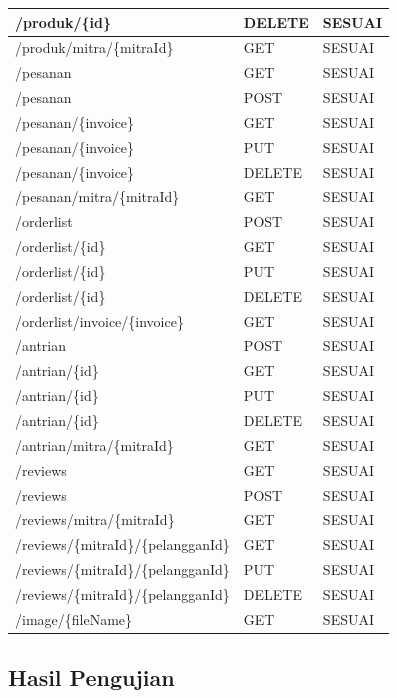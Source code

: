 \begin{longtable}{| p{10cm} | p{1.5cm} | p{1.5cm} |}
  \hline
  /produk/\{id\} & DELETE  & SESUAI \\
  \hline
  /produk/mitra/\{mitraId\} & GET  & SESUAI \\
  \hline
  /pesanan & GET  & SESUAI \\
  \hline
  /pesanan & POST  & SESUAI \\
  \hline
  /pesanan/\{invoice\} & GET  & SESUAI \\
  \hline
  /pesanan/\{invoice\} & PUT  & SESUAI \\
  \hline
  /pesanan/\{invoice\} & DELETE  & SESUAI \\
  \hline
  /pesanan/mitra/\{mitraId\} & GET  & SESUAI \\
  \hline
  /orderlist & POST  & SESUAI \\
  \hline
  /orderlist/\{id\} & GET  & SESUAI \\
  \hline
  /orderlist/\{id\} & PUT  & SESUAI \\
  \hline
  /orderlist/\{id\} & DELETE  & SESUAI \\
  \hline
  /orderlist/invoice/\{invoice\} & GET  & SESUAI \\
  \hline
  /antrian & POST  & SESUAI \\
  \hline
  /antrian/\{id\} & GET  & SESUAI \\
  \hline
  /antrian/\{id\} & PUT  & SESUAI \\
  \hline
  /antrian/\{id\} & DELETE  &  SESUAI \\
  \hline
  /antrian/mitra/\{mitraId\} & GET  & SESUAI \\
  \hline
  /reviews & GET  & SESUAI \\
  \hline
  /reviews & POST  & SESUAI \\
  \hline
  /reviews/mitra/\{mitraId\} & GET  & SESUAI \\
  \hline
  /reviews/\{mitraId\}/\{pelangganId\} & GET  & SESUAI \\
  \hline
  /reviews/\{mitraId\}/\{pelangganId\} & PUT  & SESUAI \\
  \hline
  /reviews/\{mitraId\}/\{pelangganId\} & DELETE  & SESUAI \\
  \hline
  /image/\{fileName\} & GET  & SESUAI \\
  \hline

\end{longtable}



\subsection{Hasil Pengujian}
